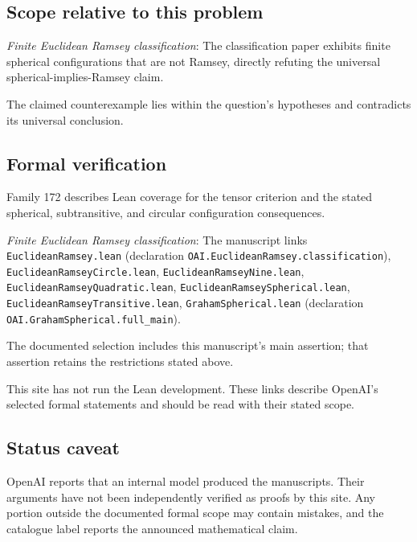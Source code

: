 \documentclass[11pt]{article}
\begin{document}
\subsection{Scope relative to this problem}
\textit{Finite Euclidean Ramsey classification}: The classification paper exhibits finite spherical configurations that are not Ramsey, directly refuting the universal spherical-implies-Ramsey claim.

The claimed counterexample lies within the question’s hypotheses and contradicts its universal conclusion.

\subsection{Formal verification}
Family 172 describes Lean coverage for the tensor criterion and the stated spherical, subtransitive, and circular configuration consequences.

\textit{Finite Euclidean Ramsey classification}: The manuscript links \texttt{EuclideanRamsey.lean} (declaration \texttt{OAI.EuclideanRamsey.classification}), \texttt{EuclideanRamseyCircle.lean}, \texttt{EuclideanRamseyNine.lean}, \texttt{EuclideanRamseyQuadratic.lean}, \texttt{EuclideanRamseySpherical.lean}, \texttt{EuclideanRamseyTransitive.lean}, \texttt{GrahamSpherical.lean} (declaration \texttt{OAI.GrahamSpherical.full\_main}).

The documented selection includes this manuscript’s main assertion; that assertion retains the restrictions stated above.

This site has not run the Lean development. These links describe OpenAI’s selected formal statements and should be read with their stated scope.

\subsection{Status caveat}
OpenAI reports that an internal model produced the manuscripts. Their arguments have not been independently verified as proofs by this site. Any portion outside the documented formal scope may contain mistakes, and the catalogue label reports the announced mathematical claim.
\end{document}
